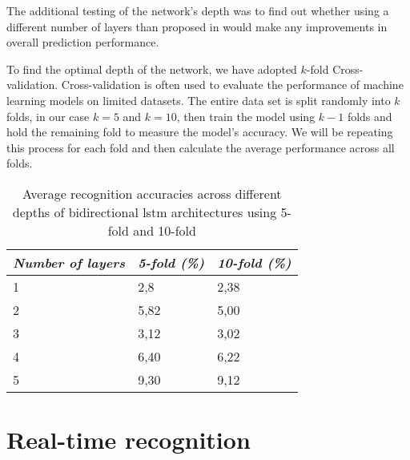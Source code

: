 The additional testing of the network's depth was to find out whether using a different number of layers than proposed in \cite{bidirect_dynam} would make any improvements in overall prediction performance.

To find the optimal depth of the network, we have adopted $k$-fold Cross-validation. Cross-validation is often used to evaluate the performance of machine learning models on limited datasets. The entire data set is split randomly into $k$ folds, in our case $k=5$ and $k=10$, then train the model using $k-1$ folds and hold the remaining fold to measure the model's accuracy. We will be repeating this process for each fold and then calculate the average performance across all folds.

\begin{table}[ht]
    \centering
    \caption{Average recognition accuracies across different depths of bidirectional lstm architectures using 5-fold and 10-fold}
    \begin{tabular}{ |p{3cm}| p{3cm} |p{3cm}|} 
        \hline
        \hfil \textit{Number of layers}
        & \hfil \textit{5-fold (\%)}
         & \hfil \textit{10-fold (\%)} \\
        \hline\hline
        \hfil 1 				& \hfil 2,8				& \hfil 2,38	\\
        \hline
        \hfil 2 				& \hfil 5,82				& \hfil 5,00 	\\
        \hline
        \hfil 3 				& \hfil 3,12				& \hfil 3,02	\\
        \hline
        \hfil 4 				& \hfil 6,40				& \hfil 6,22	\\
        \hline
        \hfil 5 				& \hfil 9,30				& \hfil 9,12	\\
        \hline
    \end{tabular}
    \label{tab:HT_results_table}
\end{table}




\section{Real-time recognition}

